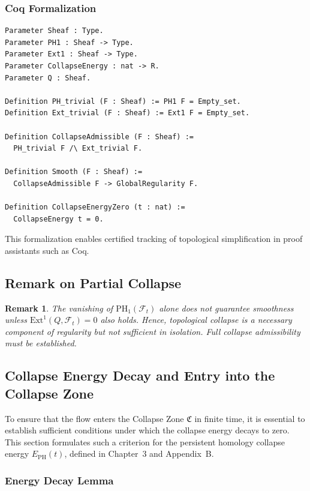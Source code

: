 \documentclass[11pt]{article}
\newtheorem{remark}[theorem]{Remark}
\begin{document}
\subsubsection*{Coq Formalization}
\begin{lstlisting}
Parameter Sheaf : Type.
Parameter PH1 : Sheaf -> Type.
Parameter Ext1 : Sheaf -> Type.
Parameter CollapseEnergy : nat -> R.
Parameter Q : Sheaf.

Definition PH_trivial (F : Sheaf) := PH1 F = Empty_set.
Definition Ext_trivial (F : Sheaf) := Ext1 F = Empty_set.

Definition CollapseAdmissible (F : Sheaf) :=
  PH_trivial F /\ Ext_trivial F.

Definition Smooth (F : Sheaf) :=
  CollapseAdmissible F -> GlobalRegularity F.

Definition CollapseEnergyZero (t : nat) :=
  CollapseEnergy t = 0.
\end{lstlisting}

This formalization enables certified tracking of topological simplification in proof assistants such as Coq.

\subsection{Remark on Partial Collapse}

\begin{remark}
The vanishing of \( \mathrm{PH}_1(\mathcal{F}_t) \) alone does not guarantee smoothness unless \( \mathrm{Ext}^1(Q, \mathcal{F}_t) = 0 \) also holds. Hence, topological collapse is a \emph{necessary component} of regularity but not \emph{sufficient} in isolation. Full collapse admissibility must be established.
\end{remark}

\subsection{Collapse Energy Decay and Entry into the Collapse Zone}
\label{sec:collapse-energy-decay}

To ensure that the flow enters the Collapse Zone \( \mathfrak{C} \) in finite time, it is essential to establish sufficient conditions under which the collapse energy decays to zero. This section formulates such a criterion for the persistent homology collapse energy \( E_{\mathrm{PH}}(t) \), defined in Chapter~3 and Appendix~B.

\subsubsection*{Energy Decay Lemma}
\end{document}
